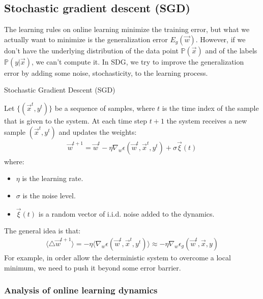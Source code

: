 \documentclass[11pt]{book} %
\begin{document}
\subsection{Stochastic gradient descent (SGD)}
The learning rules on online learning minimize the training error, but what we actually want to minimize is the generalization error $E_{g}(\vec{w})$.
However, if we don't have the underlying distribution of the data point $\mathbb{P}(\vec{x})$ and of the labels $\mathbb{P}(y|\vec{x})$, we can't compute it.
In SDG, we try to improve the generalization error by adding some noise, stochasticity, to the learning process.

\begin{algorithm}[H]
    \SetAlgoLined
    \caption{Stochastic Gradient Descent (SGD)}
    Let $\{ (\vec{x}^t, y^t) \}$ be a sequence of samples, where $t$ is the time index of the sample that is given to the system.
    At each time step $t+1$ the system receives a new sample $(\vec{x}^{t}, y^{t})$ and updates the weights: 
    \begin{align*}
        \vec{w}^{t+1} = \vec{w}^{t} - \eta \nabla_w \epsilon(\vec{w}^{t}, \vec{x}^{t}, y^{t}) + \sigma \vec{\xi}(t) 
    \end{align*}
    where: 
    \begin{itemize}
        \item $\eta$ is the learning rate.
        \item $\sigma$ is the noise level.
        \item $\vec{\xi}(t)$ is a random vector of i.i.d. noise added to the dynamics.
    \end{itemize}
\end{algorithm}

The general idea is that:
\begin{align*}
    \langle \bigtriangleup \vec{w}^{t+1} \rangle = - \eta \langle \nabla_w \epsilon(\vec{w}^{t}, \vec{x}^{t}, y^{t}) \rangle \approx -\eta \nabla_w \epsilon_g (\vec{w}^{t}, \vec{x}, y) 
\end{align*}
For example, in order allow the deterministic system to overcome a local minimum, we need to push it beyond some error barrier.

%
%



%
%

\subsubsection{Analysis of online learning dynamics}
\end{document}
